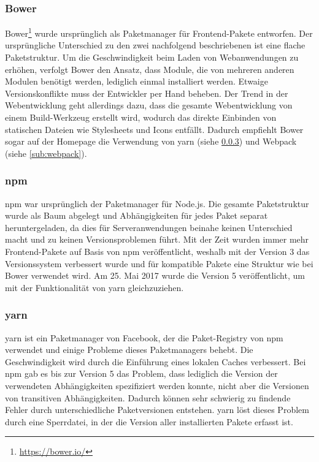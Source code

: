\subsubsection{Bower}
\label{sub:bower}
Bower\footnote{\url{https://bower.io/}} wurde ursprünglich als Paketmanager für Frontend-Pakete entworfen.
Der ursprüngliche Unterschied zu den zwei nachfolgend beschriebenen ist eine flache Paketstruktur.
Um die Geschwindigkeit beim Laden von Webanwendungen zu erhöhen, verfolgt Bower den Ansatz, dass Module, die von mehreren anderen Modulen benötigt werden, lediglich einmal installiert werden.
Etwaige Versionskonflikte muss der Entwickler per Hand beheben.
Der Trend in der Webentwicklung geht allerdings dazu, dass die gesamte Webentwicklung von einem Build-Werkzeug erstellt wird, wodurch das direkte Einbinden von statischen Dateien wie Stylesheets und Icons entfällt.
Dadurch empfiehlt Bower sogar auf der Homepage die Verwendung von yarn (siehe \cref{sub:yarn}) und Webpack (siehe \cref{sub:webpack}).

\subsubsection{npm}
\label{sub:npm}
npm war ursprünglich der Paketmanager für Node.js.
Die gesamte Paketstruktur wurde als Baum abgelegt und Abhängigkeiten für jedes Paket separat heruntergeladen, da dies für Serveranwendungen beinahe keinen Unterschied macht und zu keinen Versionsproblemen führt.
Mit der Zeit wurden immer mehr Frontend-Pakete auf Basis von npm veröffentlicht, weshalb mit der Version 3 das Versionssystem verbessert wurde und für kompatible Pakete eine Struktur wie bei Bower verwendet wird.
Am 25. Mai 2017 wurde die Version 5 veröffentlicht, um mit der Funktionalität von yarn gleichzuziehen.

\subsubsection{yarn}
\label{sub:yarn}
yarn ist ein Paketmanager von Facebook, der die Paket-Registry von npm verwendet und einige Probleme dieses Paketmanagers behebt.
Die Geschwindigkeit wird durch die Einführung eines lokalen Caches verbessert.
Bei npm gab es bis zur Version 5 das Problem, dass lediglich die Version der verwendeten Abhängigkeiten spezifiziert werden konnte, nicht aber die Versionen von transitiven Abhängigkeiten.
Dadurch können sehr schwierig zu findende Fehler durch unterschiedliche Paketversionen entstehen.
yarn löst dieses Problem durch eine Sperrdatei, in der die Version aller installierten Pakete erfasst ist.

